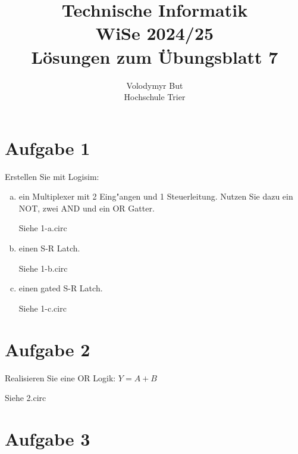 \documentclass[10pt, oneside]{article}
\title{Technische Informatik\\[10pt]\Large{WiSe 2024/25}\\[15pt]\Large{L{\"o}sungen zum {\"U}bungsblatt 7}}
\author{Volodymyr But\\[10pt]Hochschule Trier}
\date{}
\begin{document}
\maketitle
\vspace{25px}

\section{Aufgabe 1}

Erstellen Sie mit Logisim:

\begin{enumerate}[(a)]
    \item ein Multiplexer mit 2 Eing"angen und 1 Steuerleitung. Nutzen Sie dazu ein NOT, zwei AND und ein OR Gatter.

        Siehe 1-a.circ

    \item einen S-R Latch.

        Siehe 1-b.circ

    \item einen gated S-R Latch.

        Siehe 1-c.circ
\end{enumerate}

\section{Aufgabe 2}

Realisieren Sie eine OR Logik: $Y = A + B$

Siehe 2.circ

\section{Aufgabe 3}
\end{document}
